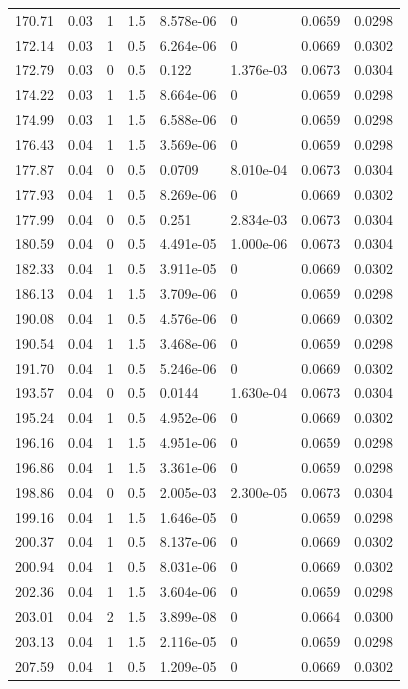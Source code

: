 \documentclass[preview]{standalone}
\begin{document}
{{{\begin{tabular}{L{1.2cm}C{1.2cm} C{0.3cm}C{0.5cm} C{1.4cm}C{1.4cm} C{1.4cm}C{1.4cm}}
  170.71  &  0.03  & 1     & 1.5 &  8.578e-06  & 0  & 0.0659 &  0.0298   \\ 
  172.14  &  0.03  & 1     & 0.5 &  6.264e-06  & 0  & 0.0669 &  0.0302   \\ 
  172.79  &  0.03  & 0     & 0.5 &  0.122  & 1.376e-03  & 0.0673 &  0.0304   \\ 
  174.22  &  0.03  & 1     & 1.5 &  8.664e-06  & 0  & 0.0659 &  0.0298   \\ 
  174.99  &  0.03  & 1     & 1.5 &  6.588e-06  & 0  & 0.0659 &  0.0298   \\ 
  176.43  &  0.04  & 1     & 1.5 &  3.569e-06  & 0  & 0.0659 &  0.0298   \\ 
  177.87  &  0.04  & 0     & 0.5 &  0.0709  & 8.010e-04  & 0.0673 &  0.0304   \\ 
  177.93  &  0.04  & 1     & 0.5 &  8.269e-06  & 0  & 0.0669 &  0.0302   \\ 
  177.99  &  0.04  & 0     & 0.5 &  0.251  & 2.834e-03  & 0.0673 &  0.0304   \\ 
  180.59  &  0.04  & 0     & 0.5 &  4.491e-05  & 1.000e-06  & 0.0673 &  0.0304   \\ 
  182.33  &  0.04  & 1     & 0.5 &  3.911e-05  & 0  & 0.0669 &  0.0302   \\ 
  186.13  &  0.04  & 1     & 1.5 &  3.709e-06  & 0  & 0.0659 &  0.0298   \\ 
  190.08  &  0.04  & 1     & 0.5 &  4.576e-06  & 0  & 0.0669 &  0.0302   \\ 
  190.54  &  0.04  & 1     & 1.5 &  3.468e-06  & 0  & 0.0659 &  0.0298   \\ 
  191.70  &  0.04  & 1     & 0.5 &  5.246e-06  & 0  & 0.0669 &  0.0302   \\ 
  193.57  &  0.04  & 0     & 0.5 &  0.0144  & 1.630e-04  & 0.0673 &  0.0304   \\ 
  195.24  &  0.04  & 1     & 0.5 &  4.952e-06  & 0  & 0.0669 &  0.0302   \\ 
  196.16  &  0.04  & 1     & 1.5 &  4.951e-06  & 0  & 0.0659 &  0.0298   \\ 
  196.86  &  0.04  & 1     & 1.5 &  3.361e-06  & 0  & 0.0659 &  0.0298   \\ 
  198.86  &  0.04  & 0     & 0.5 &  2.005e-03  & 2.300e-05  & 0.0673 &  0.0304   \\ 
  199.16  &  0.04  & 1     & 1.5 &  1.646e-05  & 0  & 0.0659 &  0.0298   \\ 
  200.37  &  0.04  & 1     & 0.5 &  8.137e-06  & 0  & 0.0669 &  0.0302   \\ 
  200.94  &  0.04  & 1     & 0.5 &  8.031e-06  & 0  & 0.0669 &  0.0302   \\ 
  202.36  &  0.04  & 1     & 1.5 &  3.604e-06  & 0  & 0.0659 &  0.0298   \\ 
  203.01  &  0.04  & 2     & 1.5 &  3.899e-08  & 0  & 0.0664 &  0.0300   \\ 
  203.13  &  0.04  & 1     & 1.5 &  2.116e-05  & 0  & 0.0659 &  0.0298   \\ 
  207.59  &  0.04  & 1     & 0.5 &  1.209e-05  & 0  & 0.0669 &  0.0302   \\ 
\hline 
\end{tabular} 

}}}
\end{document}
